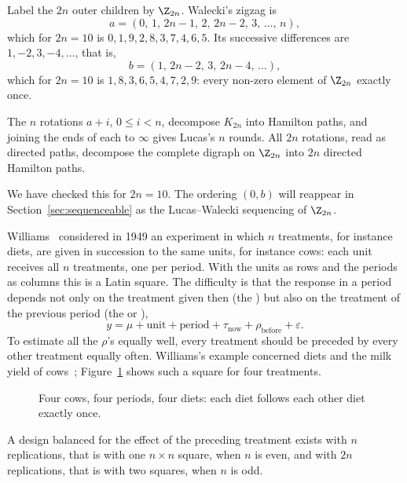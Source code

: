 
Label the $2n$ outer children by $\Z_{2n}$. Walecki's zigzag is
\[
a=(0,\,1,\,2n-1,\,2,\,2n-2,\,3,\,\dots,\,n),
\]
which for $2n=10$ is $0,1,9,2,8,3,7,4,6,5$. Its successive differences are $1,-2,3,-4,\dots$, that is,
\[
b=(1,\,2n-2,\,3,\,2n-4,\,\dots),
\]
which for $2n=10$ is $1,8,3,6,5,4,7,2,9$: every non-zero element of $\Z_{2n}$ exactly once.

\begin{fact}\label{fact:walecki}
The $n$ rotations $a+i$, $0\leq i<n$, decompose $K_{2n}$ into Hamilton paths, and joining the ends of each to $\infty$ gives Lucas's $n$ rounds. All $2n$ rotations, read as directed paths, decompose the complete digraph on $\Z_{2n}$ into $2n$ directed Hamilton paths.
\end{fact}

We have checked this for $2n=10$. The ordering $(0,b)$ will reappear in Section~\ref{sec:sequenceable} as the Lucas--Walecki sequencing of $\Z_{2n}$.


Williams~\cite{wil49} considered in 1949 an experiment in which $n$ treatments, for instance diets, are given in succession to the same units, for instance cows: each unit receives all $n$ treatments, one per period. With the units as rows and the periods as columns this is a Latin square. The difficulty is that the response in a period depends not only on the treatment given then (the ) but also on the treatment of the previous period (the  or ),
\[
y=\mu+\text{unit}+\text{period}+\tau_{\text{now}}+\rho_{\text{before}}+\varepsilon .
\]
To estimate all the $\rho$'s equally well, every treatment should be preceded by every other treatment equally often. Williams's example concerned diets and the milk yield of cows~\cite[\S3.6]{oll25}; Figure~\ref{fig:cows} shows such a square for four treatments.

\begin{figure}[ht]
\centering

\caption{Four cows, four periods, four diets: each diet follows each other diet exactly once.}
\label{fig:cows}
\end{figure}

\begin{theorem}\label{thm:williams}
A design balanced for the effect of the preceding treatment exists with $n$ replications, that is with one $n\times n$ square, when $n$ is even, and with $2n$ replications, that is with two squares, when $n$ is odd.
\end{theorem}


